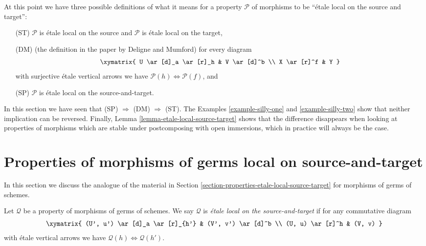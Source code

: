 \begin{remark}
\label{remark-compare-definitions}
At this point we have three possible definitions of what it means for a
property $\mathcal{P}$ of morphisms to be ``\'etale local on the source and
target'':
\begin{enumerate}
\item[(ST)] $\mathcal{P}$ is \'etale local on the source and $\mathcal{P}$ is
\'etale local on the target,
\item[(DM)] (the definition in the paper \cite[Page 100]{DM} by
Deligne and Mumford) for every diagram
$$
\xymatrix{
U \ar[d]_a \ar[r]_h & V \ar[d]^b \\
X \ar[r]^f & Y
}
$$
with surjective \'etale vertical arrows we have
$\mathcal{P}(h) \Leftrightarrow \mathcal{P}(f)$, and
\item[(SP)] $\mathcal{P}$ is \'etale local on the source-and-target.
\end{enumerate}
In this section we have seen that (SP) $\Rightarrow$ (DM) $\Rightarrow$ (ST).
The
Examples \ref{example-silly-one} and \ref{example-silly-two}
show that neither implication can be reversed. Finally,
Lemma \ref{lemma-etale-local-source-target}
shows that the difference disappears when looking at properties of
morphisms which are stable under postcomposing with open immersions, which
in practice will always be the case.
\end{remark}






\section{Properties of morphisms of germs local on source-and-target}
\label{section-local-source-target-at-point}

\noindent
In this section we discuss the analogue of the material in
Section \ref{section-properties-etale-local-source-target}
for morphisms of germs of schemes.

\begin{definition}
\label{definition-local-source-target-at-point}
Let $\mathcal{Q}$ be a property of morphisms of germs of schemes.
We say $\mathcal{Q}$ is  {\it \'etale local on the source-and-target}
if for any commutative diagram
$$
\xymatrix{
(U', u') \ar[d]_a \ar[r]_{h'} & (V', v') \ar[d]^b \\
(U, u) \ar[r]^h & (V, v)
}
$$
with \'etale vertical arrows we have
$\mathcal{Q}(h) \Leftrightarrow \mathcal{Q}(h')$.
\end{definition}

